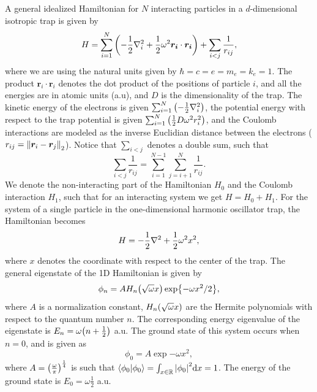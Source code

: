 A general idealized Hamiltonian for $N$ interacting particles in a $d$-dimensional isotropic trap is given by 
\begin{equation}
    H = \sum_{i=1}^N \qty(-\frac{1}{2}\laplacian_i+ \frac{1}{2}\omega^2 \bm{r_i}\cdot\bm{r_i}) + \sum_{i<j}\frac{1}{r_{ij}}, 
\end{equation}
where we are using the natural units given by $\hbar=c=e=m_e=k_e=1$. The product $\bm{r}_i\cdot\bm{r}_i$ denotes the dot product of the positions of particle $i$, and all the energies are in atomic units (a.u), and $D$ is the dimensionality of the trap. The kinetic energy of the electrons is given $\sum_{i=1}^N\qty(-\frac{1}{2}\laplacian_i)$, the potential energy with respect to the trap potential is given $\sum_{i=1}^N \qty(\frac{1}{2}D\omega^2r_i^2)$, and the Coulomb interactions are modeled as the inverse Euclidian distance between the electrons ($r_{ij} = \norm{\bm{r}_i-\bm{r}_j}_2$). Notice that $\sum_{i<j}$ denotes a double sum, such that 
\begin{equation}
    \sum_{i<j}\frac{1}{r_{ij}} = \sum_{i=1}^{N-1}\sum_{j=i+1}^N\frac{1}{r_{ij}}. 
\end{equation}
We denote the non-interacting part of the Hamiltonian $H_0$ and the Coulomb interaction $H_1$, such that for an interacting system we get $H = H_0 + H_1$. For the system of a single particle in the one-dimensional harmonic oscillator trap, the Hamiltonian becomes
\begin{equation}\label{eq:1dHamiltonian}
    H = -\frac{1}{2}\laplacian + \frac{1}{2}\omega^2 x^2, 
\end{equation}
where $x$ denotes the coordinate with respect to the center of the trap. The general eigenstate of the 1D Hamiltonian is given by  
\begin{equation}
    \phi_n = AH_n\qty(\sqrt{\omega}x)\exp{-\omega x^2/2}, 
\end{equation}
where $A$ is a normalization constant, $H_n\qty(\sqrt{\omega}x)$ are the Hermite polynomials with respect to the quantum number $n$. The corresponding energy eigenvalue of the eigenstate is $E_n = \omega\qty(n + \frac{1}{2})$ a.u. The ground state of this system occurs when $n=0$, and is given as 
\begin{equation}
    \phi_0 = A\exp{-\omega x^2}, 
\end{equation}
where $A = \qty(\frac{\omega}{\pi})^{\frac{1}{4}}$ is such that $\braket{\phi_0} = \int_{x\in\mathbb{R}}\abs{\phi_0}^2\mathrm{d}x = 1$. The energy of the ground state is $E_0 = \omega\frac{1}{2}$ a.u. 

